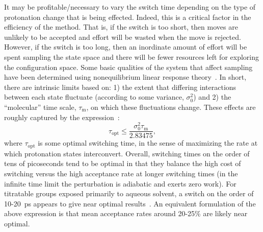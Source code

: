It may be profitable/necessary to vary the switch time depending on the type of
  protonation change that is being effected.
Indeed, this is a critical factor in the efficiency of the method.
That is, if the switch is too short, then moves are unlikely to be accepted and
  effort will be wasted when the move is rejected.
However, if the switch is too long, then an inordinate amount of effort will be
  spent sampling the state space and there will be fewer resources left for
  exploring the configuration space.
Some basic qualities of the system that affect sampling have been determined
  using nonequilibrium linear response
  theory~\cite{Radak_JChemPhys_2016_v145_p134109}.
In short, there are intrinsic limits based on:
  1) the extent that differing interactions between each state fluctuate
  (according to some variance, $\sigma_0^2$)
  and
  2) the ``molecular'' time scale, $\tau_{\text{m}}$, on which these
  fluctuations change.
These effects are roughly captured by the
  expression~\cite{Radak_JChemPhys_2016_v145_p134109, Radak_cpH_2017}:
\begin{equation*}
  \tau_{\text{opt}}
  \le
  \frac{\sigma_0^2 \tau_{\text{m}}}{2.83475},
\end{equation*}
  where $\tau_{\text{opt}}$ is some optimal switching time, in the sense of
  maximizing the rate at which protonation states interconvert.
Overall, switching times on the order of tens of picoseconds tend to be optimal
  in that they balance the high cost of switching versus the high acceptance
  rate at longer switching times (in the infinite time limit the perturbation
  is adiabatic and exerts zero work).
For titratable groups exposed primarily to aqueous solvent, a switch on the
  order of 10-20~ps appears to give near optimal
  results~\cite{Radak_JChemPhys_2016_v145_p134109, Radak_cpH_2017}.
An equivalent formulation of the above expression is that mean acceptance rates
  around 20-25\% are likely near optimal.

